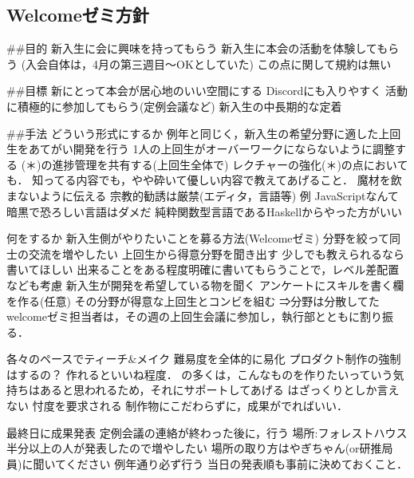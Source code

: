 \subsection*{Welcomeゼミ方針}


##目的
新入生に会に興味を持ってもらう 
新入生に本会の活動を体験してもらう
(入会自体は，4月の第三週目～OKとしていた)
この点に関して規約は無い

##目標
新\firstGrade{}にとって本会が居心地のいい空間にする
Discordにも入りやすく
活動に積極的に参加してもらう(定例会議など)
新入生の中長期的な定着


##手法
    どういう形式にするか
        例年と同じく，新入生の希望分野に適した上回生をあてがい開発を行う
        1人の上回生がオーバーワークにならないように調整する
        (＊)\firstGrade{}の進捗管理を共有する(上回生全体で)
        レクチャーの強化(＊)の点においても．
        知ってる内容でも，やや砕いて優しい内容で教えてあげること．
        魔材を飲まないように伝える
        宗教的勧誘は厳禁(エディタ，言語等)
            例
            JavaScriptなんて暗黒で恐ろしい言語はダメだ
            純粋関数型言語であるHaskellからやった方がいい

    何をするか
        新入生側がやりたいことを募る方法(Welcomeゼミ)
            分野を絞って\firstGrade{}同士の交流を増やしたい
            上回生から得意分野を聞き出す
        少しでも教えられるなら書いてほしい
            出来ることをある程度明確に書いてもらうことで，レベル差配置なども考慮
        新入生が開発を希望している物を聞く
            アンケートにスキルを書く欄を作る(任意)
        その分野が得意な上回生とコンビを組む
            ⇒分野は分散してた
            welcomeゼミ担当者は，その週の上回生会議に参加し，執行部とともに割り振る．

        各々のペースでティーチ&メイク
            難易度を全体的に易化
            プロダクト制作の強制はするの？
            作れるといいね程度．
                \firstGrade{}の多くは，こんなものを作りたいっていう気持ちはあると思われるため，それにサポートしてあげる
                \firstGrade{}はざっくりとしか言えない
                忖度を要求される
                制作物にこだわらずに，成果がでればいい．

        最終日に成果発表
            定例会議の連絡が終わった後に，行う
            場所:フォレストハウス
                半分以上の人が発表したので増やしたい
                場所の取り方はやぎちゃん(or研推局員)に聞いてください
            例年通り必ず行う
            当日の発表順も事前に決めておくこと．
             
